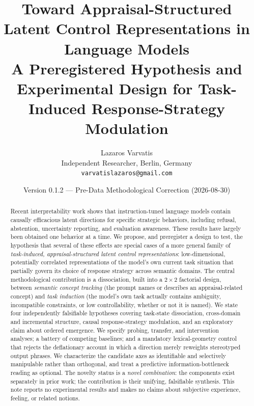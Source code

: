 \documentclass[11pt]{article}
\title{\textbf{Toward Appraisal-Structured Latent Control Representations in Language Models}\\[0.4em]
\large A Preregistered Hypothesis and Experimental Design for Task-Induced Response-Strategy Modulation}
\author{Lazaros Varvatis\\
\small Independent Researcher, Berlin, Germany\\
\small \texttt{varvatislazaros@gmail.com}}
\date{Version 0.1.2 --- Pre-Data Methodological Correction (2026-08-30)}
\begin{document}
\maketitle

\begin{abstract}
\noindent
Recent interpretability work shows that instruction-tuned language models contain
causally efficacious latent directions for specific strategic behaviors, including
refusal, abstention, uncertainty reporting, and evaluation awareness. These results
have largely been obtained one behavior at a time. We propose, and preregister a
design to test, the hypothesis that several of these effects are special cases of a
more general family of \emph{task-induced, appraisal-structured latent control
representations}: low-dimensional, potentially correlated representations of the
model's own current task situation that partially govern its choice of response
strategy across semantic domains. The central methodological contribution is a
dissociation, built into a $2\times2$ factorial design, between \emph{semantic
concept tracking} (the prompt names or describes an appraisal-related concept) and
\emph{task induction} (the model's own task actually contains ambiguity,
incompatible constraints, or low controllability, whether or not it is named). We
state four independently falsifiable hypotheses covering task-state dissociation,
cross-domain and incremental structure, causal response-strategy modulation, and an
exploratory claim about ordered emergence. We specify probing, transfer, and
intervention analyses; a battery of competing baselines; and a mandatory
lexical-geometry control that rejects the deflationary account in which a direction
merely reweights stereotyped output phrases. We characterize the candidate axes as
identifiable and selectively manipulable rather than orthogonal, and treat a
predictive information-bottleneck reading as optional. The novelty status is a
\emph{novel combination}: the components exist separately in prior work; the
contribution is their unifying, falsifiable synthesis. This note reports no
experimental results and makes no claims about subjective experience, feeling, or
related notions.


\end{abstract}
\end{document}
